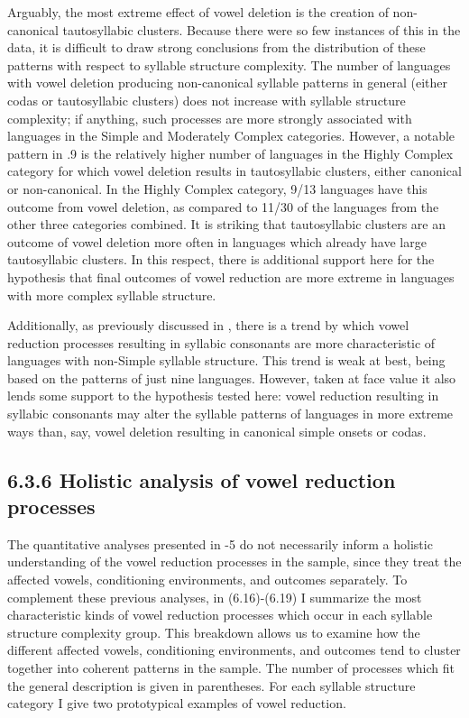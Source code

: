   Arguably, the most extreme effect of vowel deletion is the creation of non-canonical tautosyllabic clusters. Because there were so few instances of this in the data, it is difficult to draw strong conclusions from the distribution of these patterns with respect to syllable structure complexity. The number of languages with vowel deletion producing non-canonical syllable patterns in general (either codas or tautosyllabic clusters) does not increase with syllable structure complexity; if anything, such processes are more strongly associated with languages in the Simple and Moderately Complex categories. However, a notable pattern in .9 is the relatively higher number of languages in the Highly Complex category for which vowel deletion results in tautosyllabic clusters, either canonical or non-canonical. In the Highly Complex category, 9/13 languages have this outcome from vowel deletion, as compared to 11/30 of the languages from the other three categories combined. It is striking that tautosyllabic clusters are an outcome of vowel deletion more often in languages which already have large tautosyllabic clusters. In this respect, there is additional support here for the hypothesis that final outcomes of vowel reduction are more extreme in languages with more complex syllable structure.   



  Additionally, as previously discussed in , there is a trend by which vowel reduction processes resulting in syllabic consonants are more characteristic of languages with non-Simple syllable structure. This trend is weak at best, being based on the patterns of just nine languages. However, taken at face value it also lends some support to the hypothesis tested here: vowel reduction resulting in syllabic consonants may alter the syllable patterns of languages in more extreme ways than, say, vowel deletion resulting in canonical simple onsets or codas.


\subsection{6.3.6 Holistic analysis of vowel reduction processes}

  The quantitative analyses presented in -5 do not necessarily inform a holistic understanding of the vowel reduction processes in the sample, since they treat the affected vowels, conditioning environments, and outcomes separately. To complement these previous analyses, in (6.16)-(6.19) I summarize the most characteristic kinds of vowel reduction processes which occur in each syllable structure complexity group. This breakdown allows us to examine how the different affected vowels, conditioning environments, and outcomes tend to cluster together into coherent patterns in the sample. The number of processes which fit the general description is given in parentheses. For each syllable structure category I give two prototypical examples of vowel reduction.



